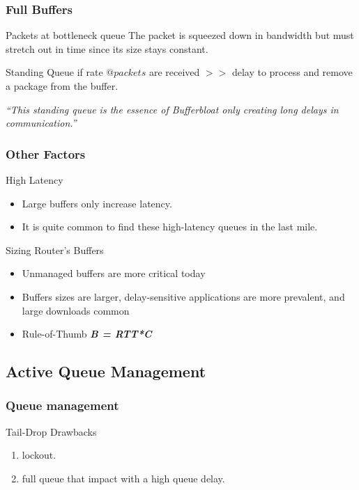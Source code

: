\begin{frame}
	\frametitle{Full Buffers}
	\begin{block}{Packets at bottleneck queue}
		The packet is squeezed down in bandwidth but must stretch out in time since its size stays constant.
	\end{block}
	\begin{block}{Standing Queue}
		if  rate $@packets$ are received $>>$  delay to process and remove a package from the buffer.
	\end{block}
	\begin{block}{}
		\centering
		\textit{``This standing queue is the essence of Bufferbloat only creating long delays in communication.''}
	\end{block}
\end{frame}

\begin{frame}
	\frametitle{Other Factors}
	\begin{block}{High Latency}
		\begin{itemize}
			\item Large buffers only increase latency.
			\item It is quite common to find these high-latency queues in the last mile.
		\end{itemize}
	\end{block}

	\begin{block}{Sizing Router's Buffers}
		\begin{itemize}
			\item Unmanaged buffers are more critical today
			\item Buffers sizes are larger, delay-sensitive applications are more prevalent, and large downloads common
			\item Rule-of-Thumb \textbf{\textit{B = RTT*C}}
		\end{itemize}
	\end{block}

\end{frame}
\subsection{Active Queue Management}

\begin{frame}
	\frametitle{Queue management}
	\begin{block}{Tail-Drop Drawbacks}
		\begin{enumerate}
			\item lockout.
			\item full queue that impact with a high queue delay.
		\end{enumerate}
	\end{block}
	
\end{frame}


